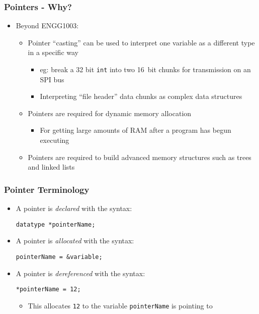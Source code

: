 \documentclass[14pt]{beamer}
\begin{document}
\begin{frame}
\frametitle{Pointers - Why?}
\begin{itemize}
\item Beyond ENGG1003:
	\begin{itemize}
		\item Pointer ``casting'' can be used to interpret one variable as a different type in a specific way
			\begin{itemize}
				\item eg: break a 32 bit \texttt{int} into two 16~bit chunks for transmission on an SPI bus
				\item Interpreting ``file header'' data chunks as complex data structures
			\end{itemize}
		\item Pointers are required for dynamic memory allocation
			\begin{itemize}
				\item For getting large amounts of RAM after a program has begun executing
			\end{itemize}
		\item Pointers are required to build advanced memory structures such as trees and linked lists
	\end{itemize}
\end{itemize}
\end{frame}

\begin{frame}[fragile]
\frametitle{Pointer Terminology}
\begin{itemize}
\item A pointer is \textit{declared} with the syntax:
\begin{lstlisting}[style=CStyle]
datatype *pointerName;
\end{lstlisting}
\item A pointer is \textit{allocated} with the syntax:
\begin{lstlisting}[style=CStyle]
pointerName = &variable;
\end{lstlisting}
\item A pointer is \textit{dereferenced} with the syntax:
\begin{lstlisting}[style=CStyle]
*pointerName = 12;
\end{lstlisting}
	\begin{itemize}
		\item This allocates \texttt{12} to the variable \texttt{pointerName} is pointing to
	\end{itemize}
\end{itemize}
\end{frame}
\end{document}
